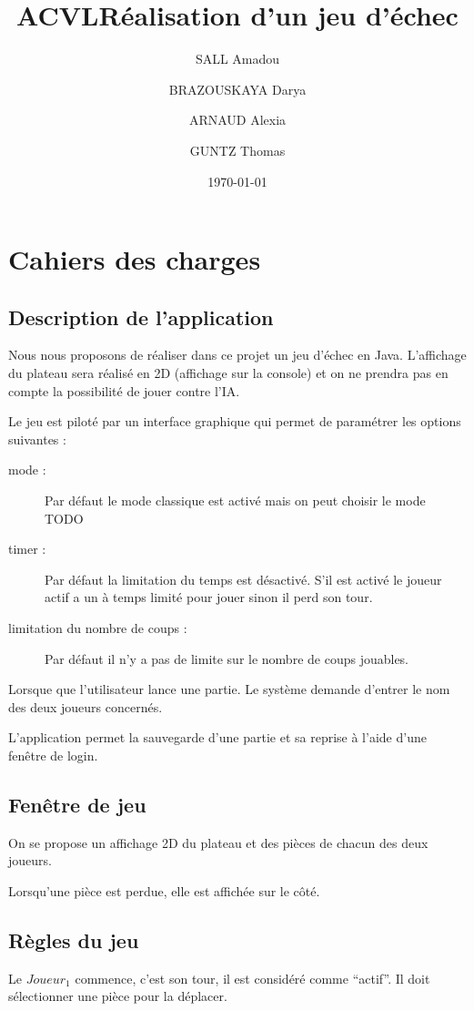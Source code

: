 \documentclass[11pt,a4paper]{report}
\title{ACVL}
\title{Réalisation d'un jeu d'échec}
\author{SALL Amadou \and BRAZOUSKAYA Darya \and ARNAUD Alexia \and GUNTZ Thomas }
\date{\today}
\begin{document}
\maketitle
\chapter*{Cahiers des charges}

\section*{Description de l'application}
Nous nous proposons de réaliser dans ce projet un jeu d'échec en Java.
L'affichage du plateau sera réalisé en 2D (affichage sur la console) et on ne prendra pas en compte la possibilité de jouer contre l'IA.

Le jeu est piloté par un interface graphique qui permet de paramétrer les options suivantes :
\begin{description}
\item[mode :] Par défaut le mode classique est activé mais on peut choisir le mode TODO
\item[timer :] Par défaut la limitation du temps est désactivé. S'il est activé le joueur actif a un à temps limité pour jouer sinon il perd son tour.
\item[limitation du nombre de coups :] Par défaut il n'y a pas de limite sur le nombre de coups jouables.
\end{description}

Lorsque que l'utilisateur lance une partie. Le système demande d'entrer le nom des deux joueurs concernés.

L'application permet la sauvegarde d'une partie et sa reprise à l'aide d'une fenêtre de login.

\section*{Fenêtre de jeu}
On se propose un affichage 2D du plateau et des pièces de chacun des deux joueurs.

Lorsqu'une pièce est perdue, elle est affichée sur le côté.

\section*{Règles du jeu}

Le $Joueur_1$ commence, c’est son tour, il est considéré comme ``actif''. Il doit sélectionner une pièce pour la déplacer.
\end{document}
